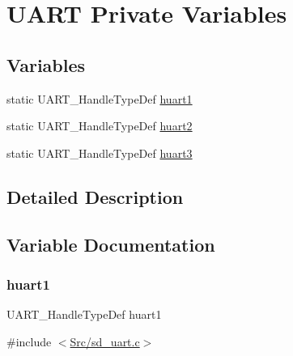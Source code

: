 \hypertarget{group___s_d___u_a_r_t___private___variables}{}\section{U\+A\+RT Private Variables}
\label{group___s_d___u_a_r_t___private___variables}
\subsection*{Variables}
\begin{DoxyCompactItemize}
\item 
static U\+A\+R\+T\+\_\+\+Handle\+Type\+Def \mbox{\hyperlink{group___s_d___u_a_r_t___private___variables_ga2cf715bef37f7e8ef385a30974a5f0d5}{huart1}}
\item 
static U\+A\+R\+T\+\_\+\+Handle\+Type\+Def \mbox{\hyperlink{group___s_d___u_a_r_t___private___variables_gaa9479c261d65eecedd3d9582f7f0f89c}{huart2}}
\item 
static U\+A\+R\+T\+\_\+\+Handle\+Type\+Def \mbox{\hyperlink{group___s_d___u_a_r_t___private___variables_gab7c63c1b0f65db92b6a4ea19edf957e1}{huart3}}
\end{DoxyCompactItemize}


\subsection{Detailed Description}


\subsection{Variable Documentation}
\mbox{\label{group___s_d___u_a_r_t___private___variables_ga2cf715bef37f7e8ef385a30974a5f0d5}} 
\subsubsection{\texorpdfstring{huart1}{huart1}}
{\footnotesize\ttfamily U\+A\+R\+T\+\_\+\+Handle\+Type\+Def huart1\hspace{0.3cm}{\ttfamily [static]}}



{\ttfamily \#include $<$\mbox{\hyperlink{sd__uart_8c}{Src/sd\+\_\+uart.\+c}}$>$}

